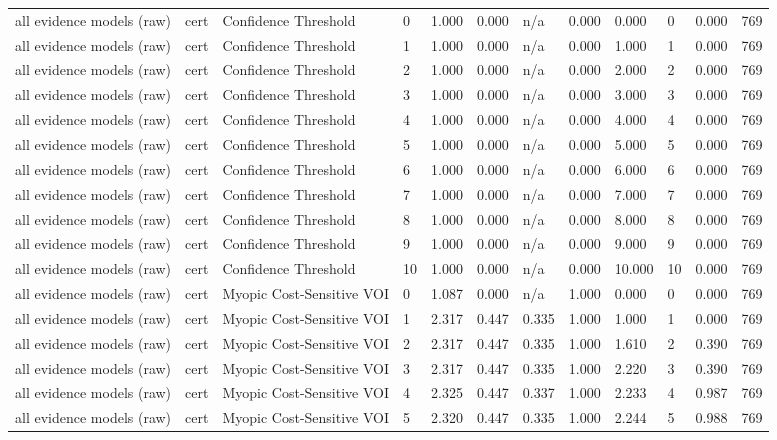 \begin{table}[!ht]
{\begin{tabular}{llllllllllll}
all evidence models (raw) & cert & Confidence Threshold & 0 & 1.000 & 0.000 & n/a & 0.000 & 0.000 & 0 & 0.000 & 769 \\
all evidence models (raw) & cert & Confidence Threshold & 1 & 1.000 & 0.000 & n/a & 0.000 & 1.000 & 1 & 0.000 & 769 \\
all evidence models (raw) & cert & Confidence Threshold & 2 & 1.000 & 0.000 & n/a & 0.000 & 2.000 & 2 & 0.000 & 769 \\
all evidence models (raw) & cert & Confidence Threshold & 3 & 1.000 & 0.000 & n/a & 0.000 & 3.000 & 3 & 0.000 & 769 \\
all evidence models (raw) & cert & Confidence Threshold & 4 & 1.000 & 0.000 & n/a & 0.000 & 4.000 & 4 & 0.000 & 769 \\
all evidence models (raw) & cert & Confidence Threshold & 5 & 1.000 & 0.000 & n/a & 0.000 & 5.000 & 5 & 0.000 & 769 \\
all evidence models (raw) & cert & Confidence Threshold & 6 & 1.000 & 0.000 & n/a & 0.000 & 6.000 & 6 & 0.000 & 769 \\
all evidence models (raw) & cert & Confidence Threshold & 7 & 1.000 & 0.000 & n/a & 0.000 & 7.000 & 7 & 0.000 & 769 \\
all evidence models (raw) & cert & Confidence Threshold & 8 & 1.000 & 0.000 & n/a & 0.000 & 8.000 & 8 & 0.000 & 769 \\
all evidence models (raw) & cert & Confidence Threshold & 9 & 1.000 & 0.000 & n/a & 0.000 & 9.000 & 9 & 0.000 & 769 \\
all evidence models (raw) & cert & Confidence Threshold & 10 & 1.000 & 0.000 & n/a & 0.000 & 10.000 & 10 & 0.000 & 769 \\
all evidence models (raw) & cert & Myopic Cost-Sensitive VOI & 0 & 1.087 & 0.000 & n/a & 1.000 & 0.000 & 0 & 0.000 & 769 \\
all evidence models (raw) & cert & Myopic Cost-Sensitive VOI & 1 & 2.317 & 0.447 & 0.335 & 1.000 & 1.000 & 1 & 0.000 & 769 \\
all evidence models (raw) & cert & Myopic Cost-Sensitive VOI & 2 & 2.317 & 0.447 & 0.335 & 1.000 & 1.610 & 2 & 0.390 & 769 \\
all evidence models (raw) & cert & Myopic Cost-Sensitive VOI & 3 & 2.317 & 0.447 & 0.335 & 1.000 & 2.220 & 3 & 0.390 & 769 \\
all evidence models (raw) & cert & Myopic Cost-Sensitive VOI & 4 & 2.325 & 0.447 & 0.337 & 1.000 & 2.233 & 4 & 0.987 & 769 \\
all evidence models (raw) & cert & Myopic Cost-Sensitive VOI & 5 & 2.320 & 0.447 & 0.335 & 1.000 & 2.244 & 5 & 0.988 & 769 \\

\end{tabular}}
\end{table}
